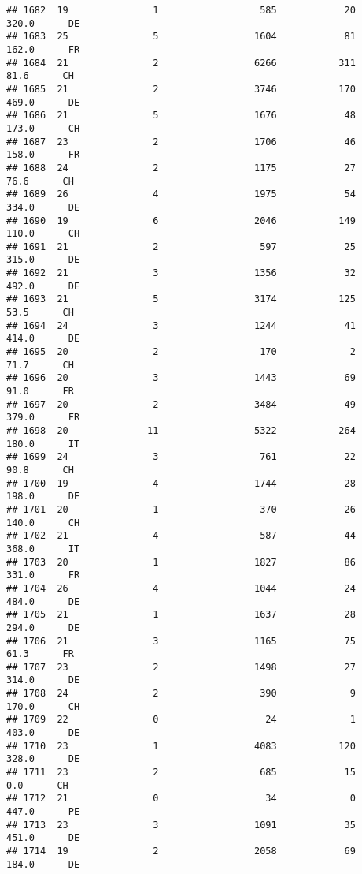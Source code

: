 \documentclass[
]{article}
\begin{document}
\begin{verbatim}
## 1682  19               1                  585            20    320.0      DE
## 1683  25               5                 1604            81    162.0      FR
## 1684  21               2                 6266           311     81.6      CH
## 1685  21               2                 3746           170    469.0      DE
## 1686  21               5                 1676            48    173.0      CH
## 1687  23               2                 1706            46    158.0      FR
## 1688  24               2                 1175            27     76.6      CH
## 1689  26               4                 1975            54    334.0      DE
## 1690  19               6                 2046           149    110.0      CH
## 1691  21               2                  597            25    315.0      DE
## 1692  21               3                 1356            32    492.0      DE
## 1693  21               5                 3174           125     53.5      CH
## 1694  24               3                 1244            41    414.0      DE
## 1695  20               2                  170             2     71.7      CH
## 1696  20               3                 1443            69     91.0      FR
## 1697  20               2                 3484            49    379.0      FR
## 1698  20              11                 5322           264    180.0      IT
## 1699  24               3                  761            22     90.8      CH
## 1700  19               4                 1744            28    198.0      DE
## 1701  20               1                  370            26    140.0      CH
## 1702  21               4                  587            44    368.0      IT
## 1703  20               1                 1827            86    331.0      FR
## 1704  26               4                 1044            24    484.0      DE
## 1705  21               1                 1637            28    294.0      DE
## 1706  21               3                 1165            75     61.3      FR
## 1707  23               2                 1498            27    314.0      DE
## 1708  24               2                  390             9    170.0      CH
## 1709  22               0                   24             1    403.0      DE
## 1710  23               1                 4083           120    328.0      DE
## 1711  23               2                  685            15      0.0      CH
## 1712  21               0                   34             0    447.0      PE
## 1713  23               3                 1091            35    451.0      DE
## 1714  19               2                 2058            69    184.0      DE

\end{verbatim}
\end{document}
